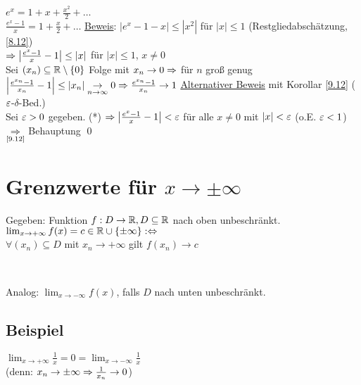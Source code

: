 {$e^x = 1 + x + \frac{x^2}{2} + \ldots$\\
$\frac{e^x-1}{x} = 1 + \frac{x}{2} + \ldots$\nl
\underline{Beweis}: $|e^x-1-x| \le |x^2|$ für $|x| \le 1$ (Restgliedabschätzung, \ref{8.12})\\
$\Rightarrow \left|\frac{e^x-1}{x} -1\right| \le |x|$ für $|x| \le 1$, $x \neq 0$\\
Sei $(x_n) \subseteq \mathbb{R} \setminus \{0\}$ Folge mit $x_n \to 0 \Rightarrow$ für $n$ groß genug\\
$\left|\frac{e^{x_n}-1}{x_n} - 1\right| \le |x_n| \underset{n \to \infty}{\to} 0 \Rightarrow \frac{e^{x_n} -1}{x_n} \to 1$\nl
\underline{Alternativer Beweis} mit Korollar \ref{9.12} ($\varepsilon$-$\delta$-Bed.)\\
Sei $\varepsilon > 0$ gegeben. (*) $\Rightarrow \left|\frac{e^x -1}{x} - 1\right| < \varepsilon$ für alle $x \neq 0$ mit $|x| < \varepsilon$ (o.E. $\varepsilon < 1$)\\
$\underset{\text{\ref{9.12}}}{\Rightarrow}$ Behauptung \qed
}

\section{\texorpdfstring{Grenzwerte für $x \to \pm \infty$}{Grenzwerte für x gegen +- Unendlich}}\label{9.15}
Gegeben: Funktion $f: D \to \mathbb{R}, D \subseteq \mathbb{R}$ nach oben unbeschränkt.\\
$\lim_{x \to +\infty} f(x) = c \in \mathbb{R} \cup \{\pm\infty\} :\Leftrightarrow$\\
$\forall (x_n) \subseteq D$ mit $x_n \to +\infty$ gilt $f(x_n) \to c$\nl
{} \ 
\nl
Analog: $\lim_{x \to -\infty} f(x)$, falls $D$ nach unten unbeschränkt.

\subsection*{Beispiel}
$\lim_{x \to +\infty} \frac{1}{x} = 0 = \lim_{x \to -\infty} \frac{1}{x}$\\
(denn: $x_n \to \pm \infty \Rightarrow \frac{1}{x_n} \to 0$)

